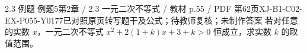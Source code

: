 \par\noindent\begin{minipage}{\linewidth}
\begin{bankitem}{2.3 例题 例题5}{第2章 / 2.3 一元二次不等式 / 教材 p.55 / PDF 第62页}{XJ-B1-C02-EX-P055-Y0177}{已对照原页转写题干及公式；待教师复核；未制作答案}
若对任意的实数 $x$，一元二次不等式 $x^2+2(1+k)x+3+k>0$ 恒成立，求实数 $k$ 的取值范围。
\end{bankitem}
\end{minipage}\par\medskip
